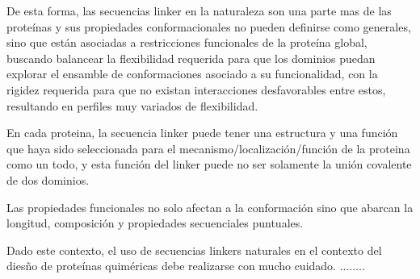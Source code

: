 De esta forma, las secuencias linker en la naturaleza son una parte mas de las proteínas y sus propiedades conformacionales no pueden definirse como generales, sino que están 
asociadas a restricciones funcionales de la proteína global, buscando balancear la flexibilidad requerida 
para que los dominios puedan explorar el ensamble de conformaciones asociado a su funcionalidad, con la rigidez requerida para que no existan interacciones desfavorables entre estos, 
resultando en perfiles muy variados de flexibilidad.

En cada proteina, la secuencia linker puede tener una estructura y una función que haya sido seleccionada para el mecanismo/localización/función de la proteina como un todo, 
y esta función del linker puede no ser solamente la unión covalente de dos dominios. 

Las propiedades funcionales no solo afectan a la conformación sino que abarcan la longitud, composición y propiedades secuenciales puntuales.





Dado este contexto, el uso de secuencias linkers naturales en el contexto del diesño de proteínas quiméricas debe realizarse con mucho cuidado.
........










